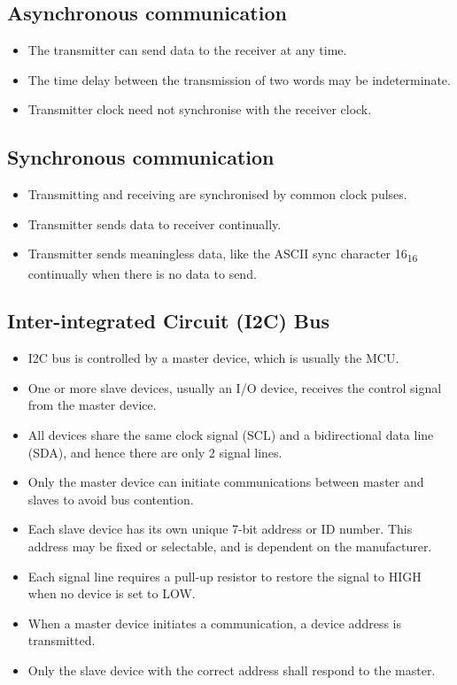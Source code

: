 \documentclass[11pt]{article}
\begin{document}
\subsection{Asynchronous communication}
\label{sec:org7546a24}
\begin{itemize}
\item The transmitter can send data to the receiver at any time.
\item The time delay between the transmission of two words may be indeterminate.
\item Transmitter clock need not synchronise with the receiver clock.
\end{itemize}

 \newpage
\subsection{Synchronous communication}
\label{sec:orged7e152}
\begin{itemize}
\item Transmitting and receiving are synchronised by common clock pulses.
\item Transmitter sends data to receiver continually.
\item Transmitter sends meaningless data, like the ASCII sync character 16\textsubscript{16} continually when there is no data to send.
\end{itemize}
\subsection{Inter-integrated Circuit (I2C) Bus}
\label{sec:org7e70a81}
\begin{itemize}
\item I2C bus is controlled by a master device, which is usually the MCU.
\item One or more slave devices, usually an I/O device, receives the control signal from the master device.
\item All devices share the same clock signal (SCL) and a bidirectional data line (SDA), and hence there are only 2 signal lines.
\item Only the master device can initiate communications between master and slaves to avoid bus contention.
\item Each slave device has its own unique 7-bit address or ID number. This address may be fixed or selectable, and is dependent on the manufacturer.
\item Each signal line requires a pull-up resistor to restore the signal to HIGH when no device is set to LOW.
\item When a master device initiates a communication, a device address is transmitted.
\item Only the slave device with the correct address shall respond to the master.
\end{itemize}
\end{document}

